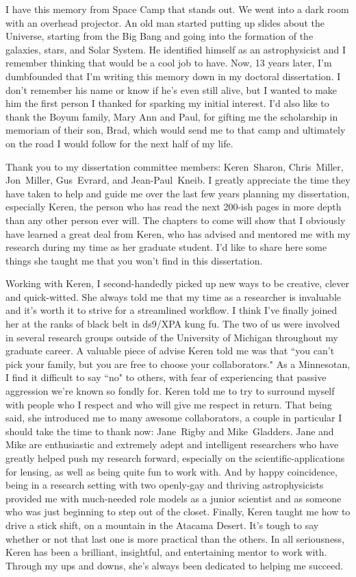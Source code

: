 I have this memory from Space Camp that stands out. We went into a dark room with an overhead projector. An old man started putting up slides about the Universe, starting from the Big Bang and going into the formation of the galaxies, stars, and Solar System. He identified himself as an astrophysicist and I remember thinking that would be a cool job to have. Now, 13 years later, I'm dumbfounded that I'm writing this memory down in my doctoral dissertation. I don't remember his name or know if he's even still alive, but I wanted to make him the first person I thanked for sparking my initial interest. I'd also like to thank the Boyum family, Mary Ann and Paul, for gifting me the scholarship in memoriam of their son, Brad, which would send me to that camp and ultimately on the road I would follow for the next half of my life.

Thank you to my dissertation committee members: Keren~Sharon, Chris~Miller, Jon~Miller, Gus~Evrard, and Jean-Paul~Kneib. I greatly appreciate the time they have taken to help and guide me over the last few years planning my dissertation, especially Keren, the person who has read the next 200-ish pages in more depth than any other person ever will. The chapters to come will show that I obviously have learned a great deal from Keren, who has advised and mentored me with my research during my time as her graduate student. I'd like to share here some things she taught me that you won't find in this dissertation.

Working with Keren, I second-handedly picked up new ways to be creative, clever and quick-witted. She always told me that my time as a researcher is invaluable and it's worth it to strive for a streamlined workflow. I think I've finally joined her at the ranks of black belt in ds9/XPA kung fu. The two of us were involved in several research groups outside of the University of Michigan throughout my graduate career. A valuable piece of advise Keren told me was that ``you can't pick your family, but you are free to choose your collaborators." As a Minnesotan, I find it difficult to say ``no" to others, with fear of experiencing that passive aggression we're known so fondly for. Keren told me to try to surround myself with people who I respect and who will give me respect in return. That being said, she introduced me to many awesome collaborators, a couple in particular I should take the time to thank now: Jane~Rigby and Mike~Gladders. Jane and Mike are enthusiastic and extremely adept and intelligent researchers who have greatly helped push my research forward, especially on the scientific-applications for lensing, as well as being quite fun to work with. And by happy coincidence, being in a research setting with two openly-gay and thriving astrophysicists provided me with much-needed role models as a junior scientist and as someone who was just beginning to step out of the closet. Finally, Keren taught me how to drive a stick shift, on a mountain in the Atacama Desert. It's tough to say whether or not that last one is more practical than the others. In all seriousness, Keren has been a brilliant, insightful, and entertaining mentor to work with. Through my ups and downs, she's always been dedicated to helping me succeed.

